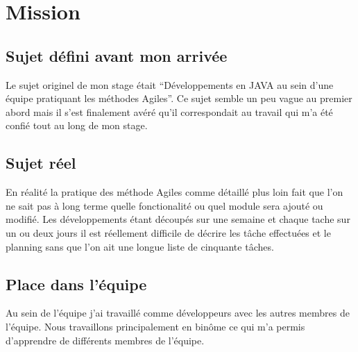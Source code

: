 \chapter{Mission}

\section{Sujet défini avant mon arrivée}
Le sujet originel de mon stage était ``Développements en JAVA au sein d'une équipe pratiquant les méthodes Agiles''. Ce sujet semble un peu vague au premier abord mais il s'est finalement avéré qu'il correspondait au travail qui m'a été confié tout au long de mon stage.
\section{Sujet réel}
En réalité la pratique des méthode Agiles comme détaillé plus loin fait que l'on ne sait pas à long terme quelle fonctionalité ou quel module sera ajouté ou modifié. Les développements étant découpés sur une semaine et chaque tache sur un ou deux jours il est réellement difficile de décrire les tâche effectuées et le planning sans que l'on ait une longue  liste de cinquante tâches.
\section{Place dans l'équipe}
Au sein de l'équipe j'ai travaillé comme développeurs avec les autres membres de l'équipe. Nous travaillons principalement en binôme ce qui m'a permis d'apprendre de différents membres de l'équipe.